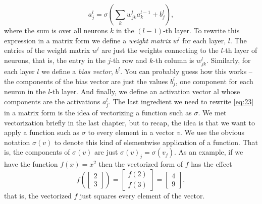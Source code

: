 \documentclass[a4paper,twoside,10pt]{book}
\begin{document}
\begin{equation}
	a^{l}_j = \sigma\left( \sum_k w^{l}_{jk} a^{l-1}_k + b^l_j \right),\label{eq:23}
\end{equation}
where the sum is over all neurons $k$ in the $(l-1)$-th layer. To rewrite this expression in a matrix form we define a \textit{weight matrix} $w^l$ for each layer, $l$. The entries of the weight matrix $w^l$ are just the weights connecting to the $l$-th layer of neurons, that is, the entry in the $j$-th row and $k$-th column is $w^l_{jk}$. Similarly, for each layer $l$ we define a \textit{bias vector}, $b^l$. You can probably guess how this works -- the components of the bias vector are just the values $b^l_j$, one component for each neuron in the $l$-th layer. And finally, we define an activation vector al whose components are the activations $a^l_j$.
The last ingredient we need to rewrite \ref{eq:23} in a matrix form is the idea of vectorizing a function such as $\sigma$. We met vectorization briefly in the last chapter, but to recap, the idea is that we want to apply a function such as $\sigma$ to every element in a vector $v$. We use the obvious notation $\sigma(v)$ to denote this kind of elementwise application of a function. That is, the components of $\sigma(v)$ are just $\sigma(v)_j = \sigma(v_j)$. As an example, if we have the function $f(x)=x^2$ then the vectorized form of $f$ has the effect
\begin{equation}
f\left(\left[ \begin{array}{c} 2 \\ 3 \end{array} \right] \right)
= \left[ \begin{array}{c} f(2) \\ f(3) \end{array} \right]
= \left[ \begin{array}{c} 4 \\ 9 \end{array} \right],
\label{eq:24}
\end{equation}
that is, the vectorized $f$ just squares every element of the vector.
\end{document}
